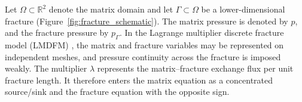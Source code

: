 \documentclass[a4paper,fleqn]{cas-sc}
\begin{document}
Let \(\Omega\subset\mathbb{R}^2\) denote the matrix domain and let
\(\Gamma\subset\Omega\) be a lower-dimensional fracture
(Figure~\ref{fig:fracture_schematic}). The matrix pressure is
denoted by \(p\), and the fracture pressure by \(p_\Gamma\). In the Lagrange
multiplier discrete fracture model (LMDFM) \citep{Koeppel2019}, the matrix and
fracture variables may be represented on independent meshes, and pressure
continuity across the fracture is imposed weakly. The multiplier \(\lambda\)
represents the matrix--fracture exchange flux per unit fracture length. It
therefore enters the matrix equation as a concentrated source/sink and the
fracture equation with the opposite sign.

\begin{center}
\centering
{}
\label{fig:fracture_schematic}
\end{center}
\end{document}
